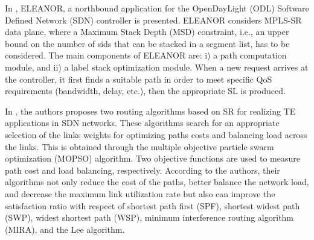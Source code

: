 In \cite{dugeon2017demonstration}, ELEANOR, a northbound application for the OpenDayLight (ODL) Software Defined Network (SDN) controller is presented.
ELEANOR considers MPLS-SR data plane, where a Maximum Stack Depth (MSD) constraint, i.e., an upper bound on the number of sids that can be stacked in a segment list, has to be considered.
The main components of ELEANOR are: i) a path computation module, and ii) a label stack optimization module.
When a new request arrives at the controller, it first finds a suitable path in order to meet specific QoS requirements (bandwidth, delay, etc.), then the appropriate SL is produced.

In \cite{hou2019optimization}, the authors proposes two routing algorithms based on SR for realizing TE applications in SDN networks. These algorithms  search for an appropriate selection of the links weights for optimizing paths costs and balancing load across the links. This is obtained through the multiple objective particle swarm optimization (MOPSO) algorithm. Two objective functions are used to measure path cost and load balancing, respectively.
According to the authors, their algorithms not only reduce the cost of the paths, better balance the network load, and decrease the maximum link utilization rate but also can improve the satisfaction ratio with respect of shortest path first (SPF), shortest widest path (SWP), widest shortest path (WSP), minimum interference routing algorithm (MIRA), and the Lee algorithm.


